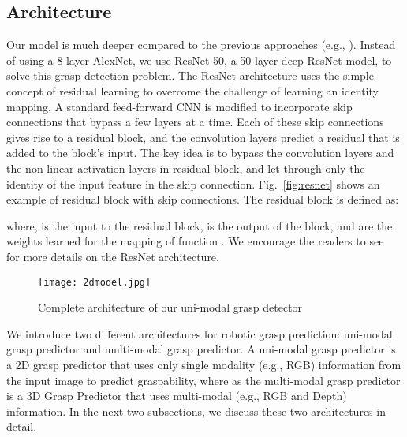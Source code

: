 \documentclass[10pt,twocolumn,letterpaper]{article}
\begin{document}
\subsection{Architecture}
Our model is much deeper compared to the previous approaches (e.g., \cite{lenz2015deep, 7487517, Redmon}). Instead of using a 8-layer AlexNet, we use ResNet-50, a 50-layer deep ResNet model, to solve this grasp detection problem. The ResNet architecture uses the simple concept of residual learning to overcome the challenge of learning an identity mapping. A standard feed-forward CNN is modified to incorporate skip connections that  bypass a few layers at a time. Each of these skip connections gives rise to a residual block, and the convolution layers predict a residual that is added to the block's input.  The key idea is to bypass the convolution layers and the non-linear activation layers in  residual block, and let through only the identity of the input feature in the skip connection. Fig.~\ref{fig:resnet} shows an example of residual block with skip connections. The residual block is defined as:

where,  is the input to the residual block,  is the output of the block, and  are the weights learned for the mapping of function . We encourage the readers to see ~\cite{he2015deep} for more details on the ResNet architecture.

\begin{figure*}[!th]
\begin{center}
\texttt{[image: 2dmodel.jpg]}
\end{center}
   \caption{Complete architecture of our uni-modal grasp detector}
\label{fig:2dmodel}
\end{figure*}

We introduce two different architectures for robotic grasp prediction: uni-modal grasp predictor and multi-modal grasp predictor. A uni-modal grasp predictor is a 2D grasp predictor that uses only single modality (e.g., RGB) information from the input image to predict graspability, where as the multi-modal grasp predictor is a 3D Grasp Predictor that uses multi-modal (e.g., RGB and Depth) information. In the next two subsections, we discuss these two architectures in detail.
\end{document}
